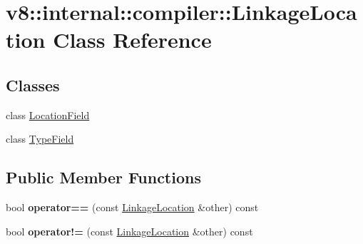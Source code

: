 \hypertarget{classv8_1_1internal_1_1compiler_1_1_linkage_location}{}\section{v8\+:\+:internal\+:\+:compiler\+:\+:Linkage\+Location Class Reference}
\label{classv8_1_1internal_1_1compiler_1_1_linkage_location}
\subsection*{Classes}
\begin{DoxyCompactItemize}
\item 
class \hyperlink{classv8_1_1internal_1_1compiler_1_1_linkage_location_1_1_location_field}{Location\+Field}
\item 
class \hyperlink{classv8_1_1internal_1_1compiler_1_1_linkage_location_1_1_type_field}{Type\+Field}
\end{DoxyCompactItemize}
\subsection*{Public Member Functions}
\begin{DoxyCompactItemize}
\item 
bool {\bfseries operator==} (const \hyperlink{classv8_1_1internal_1_1compiler_1_1_linkage_location}{Linkage\+Location} \&other) const \hypertarget{classv8_1_1internal_1_1compiler_1_1_linkage_location_a5d60006abcf67d8f441ecfed6c04677b}{}\label{classv8_1_1internal_1_1compiler_1_1_linkage_location_a5d60006abcf67d8f441ecfed6c04677b}

\item 
bool {\bfseries operator!=} (const \hyperlink{classv8_1_1internal_1_1compiler_1_1_linkage_location}{Linkage\+Location} \&other) const \hypertarget{classv8_1_1internal_1_1compiler_1_1_linkage_location_ae86c233b6d81218f8933d775ef4b24ef}{}\label{classv8_1_1internal_1_1compiler_1_1_linkage_location_ae86c233b6d81218f8933d775ef4b24ef}

\end{DoxyCompactItemize}
